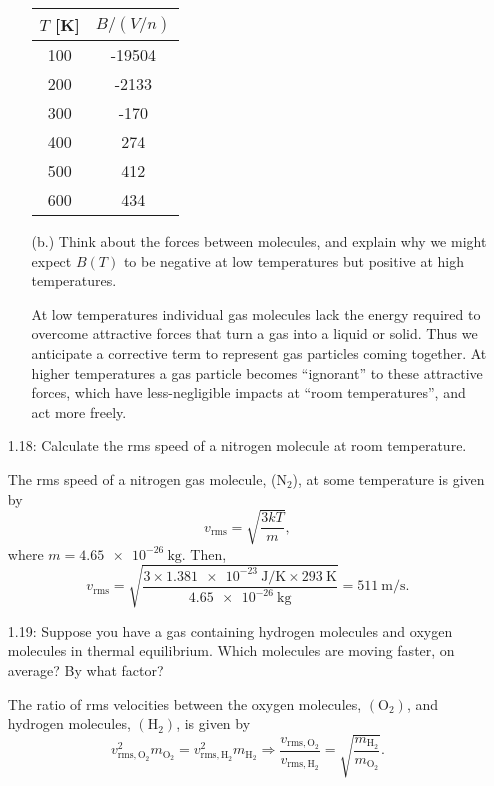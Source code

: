 \documentclass[a4paper, 12pt]{config/homework}
\begin{document}
\begin{enumerate}
\begin{enumerate}
\begin{table}[H]
\begin{center}
\begin{tabular}{cc}
\(T\) {[}K{]} & \(B/(V/n)\) \\ \hline
100           & -19504                                 \\
200           & -2133                                    \\
300           & -170                                  \\
400           & 274                                   \\
500           & 412                                   \\
600           & 434
\end{tabular}
\end{center}
\end{table}

\item[(b.)] Think about the forces between molecules, and explain why we might expect \(B(T)\) to be negative at low temperatures but positive at high temperatures.

At low temperatures individual gas molecules lack the energy required to overcome attractive forces that turn a gas into a liquid or solid. Thus we anticipate a corrective term to represent gas particles coming together. At higher temperatures a gas particle becomes ``ignorant'' to these attractive forces, which have less-negligible impacts at ``room temperatures'', and act more freely.

\end{enumerate}
\pagebreak
\item[1.18:] Calculate the rms speed of a nitrogen molecule at room temperature.

The rms speed of a nitrogen gas molecule, (\(\text{N}_2\)), at some temperature is given by
\[v_\text{rms} = \sqrt{\frac{3kT}{m}},\]
where \(m=\qty{4.65e-26}{\kg}\). Then,
\[v_\text{rms} = \sqrt{\frac{3\times\qty{1.381e-23}{\joule\per\kelvin}\times\qty{293}{\kelvin}}{{\qty{4.65e-26}{\kg}}}} = \qty{511}{\meter\per\second}.\]

\vspace{\baselineskip}
\item[1.19:] Suppose you have a gas containing hydrogen molecules and oxygen molecules in thermal equilibrium. Which molecules are moving faster, on average? By what factor?

The ratio of rms velocities between the oxygen molecules, \((\text{O}_2)\), and hydrogen molecules, \((\text{H}_2)\), is given by
\[
v_{\text{rms},\text{O}_2}^2 m_{\text{O}_2} = v_{\text{rms},\text{H}_2}^2 m_{\text{H}_2}
\Rightarrow
\frac{v_{\text{rms},\text{O}_2}}{v_{\text{rms},\text{H}_2}} = \sqrt{\frac{m_{\text{H}_2}}{m_{\text{O}_2}}}.
\]


\end{enumerate}
\end{document}

